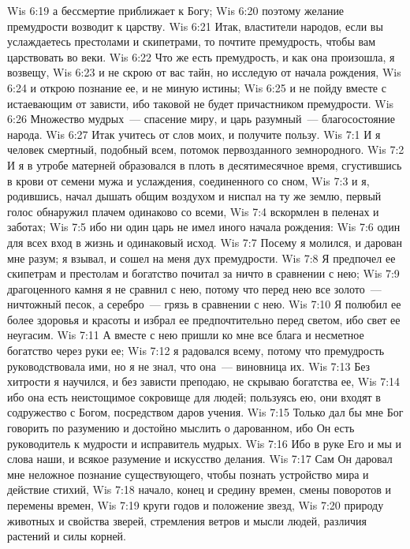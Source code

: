 \vs Wis 6:19 а бессмертие приближает к Богу;
\vs Wis 6:20 поэтому желание премудрости возводит к царству.
\vs Wis 6:21 Итак, властители народов, если вы услаждаетесь престолами и скипетрами, то почтите премудрость, чтобы вам царствовать во веки.
\vs Wis 6:22 Что же есть премудрость, и как она произошла, я возвещу,
\vs Wis 6:23 и не скрою от вас тайн, но исследую от начала рождения,
\vs Wis 6:24 и открою познание ее, и не миную истины;
\vs Wis 6:25 и не пойду вместе с истаевающим от зависти, ибо таковой не будет причастником премудрости.
\vs Wis 6:26 Множество мудрых~--- спасение миру, и царь разумный~--- благосостояние народа.
\vs Wis 6:27 Итак учитесь от слов моих, и получите пользу.
\vs Wis 7:1 И я человек смертный, подобный всем, потомок первозданного земнородного.
\vs Wis 7:2 И я в утробе матерней образовался в плоть в десятимесячное время, сгустившись в крови от семени мужа и услаждения, соединенного со сном,
\vs Wis 7:3 и я, родившись, начал дышать общим воздухом и ниспал на ту же землю, первый голос обнаружил плачем одинаково со всеми,
\vs Wis 7:4 вскормлен в пеленах и заботах;
\vs Wis 7:5 ибо ни один царь не имел иного начала рождения:
\vs Wis 7:6 один для всех вход в жизнь и одинаковый исход.
\vs Wis 7:7 Посему я молился, и дарован мне разум; я взывал, и сошел на меня дух премудрости.
\vs Wis 7:8 Я предпочел ее скипетрам и престолам и богатство почитал за ничто в сравнении с нею;
\vs Wis 7:9 драгоценного камня я не сравнил с нею, потому что перед нею все золото~--- ничтожный песок, а серебро~--- грязь в сравнении с нею.
\vs Wis 7:10 Я полюбил ее более здоровья и красоты и избрал ее предпочтительно перед светом, ибо свет ее неугасим.
\vs Wis 7:11 А вместе с нею пришли ко мне все блага и несметное богатство через руки ее;
\vs Wis 7:12 я радовался всему, потому что премудрость руководствовала ими, но я не знал, что она~--- виновница их.
\vs Wis 7:13 Без хитрости я научился, и без зависти преподаю, не скрываю богатства ее,
\vs Wis 7:14 ибо она есть неистощимое сокровище для людей; пользуясь ею, они входят в содружество с Богом, посредством даров учения.
\vs Wis 7:15 Только дал бы мне Бог говорить по разумению и достойно мыслить о дарованном, ибо Он есть руководитель к мудрости и исправитель мудрых.
\vs Wis 7:16 Ибо в руке Его и мы и слова наши, и всякое разумение и искусство делания.
\vs Wis 7:17 Сам Он даровал мне неложное познание существующего, чтобы познать устройство мира и действие стихий,
\vs Wis 7:18 начало, конец и средину времен, смены поворотов и перемены времен,
\vs Wis 7:19 круги годов и положение звезд,
\vs Wis 7:20 природу животных и свойства зверей, стремления ветров и мысли людей, различия растений и силы корней.
